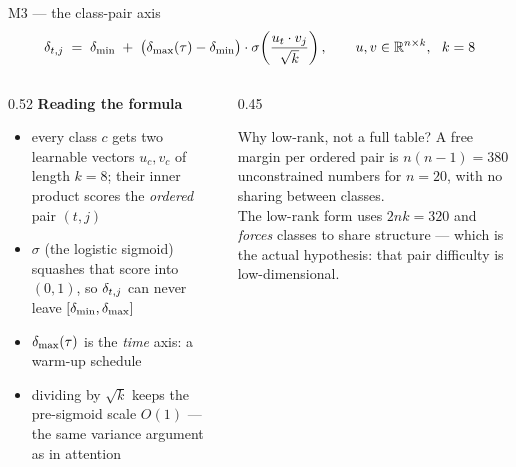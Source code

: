 \begin{frame}{M3 --- the class-pair axis}
  \small
  \[
    \delta_{t,j} \;=\; \delta_{\min} \;+\; \bigl(\delta_{\max}(\tau) - \delta_{\min}\bigr)\cdot
    \sigma\!\left(\frac{u_t \cdot v_j}{\sqrt{k}}\right),
    \qquad u, v \in \mathbb{R}^{n\times k},\ \ k = 8
  \]
  \begin{columns}[T]
    \begin{column}{0.52\textwidth}
      \textbf{Reading the formula}
      \begin{itemize}\setlength\itemsep{0.2em}
        \item every class $c$ gets two learnable vectors $u_c, v_c$ of length
              $k=8$; their inner product scores the \emph{ordered} pair $(t,j)$
        \item $\sigma$ (the logistic sigmoid) squashes that score into $(0,1)$,
              so $\delta_{t,j}$ can never leave $[\delta_{\min}, \delta_{\max}]$
        \item $\delta_{\max}(\tau)$ is the \emph{time} axis: a warm-up schedule
        \item dividing by $\sqrt{k}$ keeps the pre-sigmoid scale $O(1)$
              --- the same variance argument as in attention
      \end{itemize}
    \end{column}
    \begin{column}{0.45\textwidth}
      \begin{block}{Why low-rank, not a full table?}
        A free margin per ordered pair is $n(n-1) = 380$ unconstrained numbers
        for $n=20$, with no sharing between classes.\\[0.3em]
        The low-rank form uses $2nk = 320$ and \emph{forces} classes to share
        structure --- which is the actual hypothesis: that pair difficulty is
        low-dimensional.
      \end{block}
    \end{column}
  \end{columns}
\end{frame}

